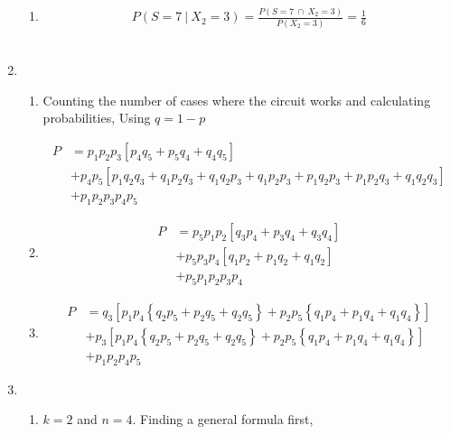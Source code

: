 \begin{enumerate}
\begin{enumerate}
			\item \begin{align}
				P(S = 7 \ |\ X_2 = 3) = \frac{P(S = 7 \ \cap\ X_2 = 3)}{P(X_2 = 3)} = \frac{1}{6}
			\end{align} \\
		
	\end{enumerate}
	
	\item \begin{enumerate}
		\item Counting the number of cases where the circuit works and calculating probabilities, Using $ q = 1-p $
		
			\begin{align}
				P &= p_1 p_2 p_3 \left[ p_4 q_5 + p_5 q_4 + q_4 q_5 \right] \nonumber \\
				&+ p_4 p_5 \left[ p_1 q_2 q_3 + q_1 p_2 q_3 + q_1 q_2 p_3 + q_1 p_2 p_3 + p_1 q_2 p_3 + p_1 p_2 q_3 + q_1 q_2 q_3 \right]	\nonumber \\
				&+ p_1 p_2 p_3 p_4 p_5
			\end{align}
		
		
		\item 
			\begin{align}
				P &= p_5 p_1 p_2 \left[ q_3 p_4 + p_3 q_4 + q_3 q_4 \right] \nonumber \\
				&+ p_5 p_3 p_4 \left[ q_1 p_2 + p_1 q_2 + q_1 q_2 \nonumber \right] \\
				&+ p_5 p_1 p_2 p_3 p_4
			\end{align}
		
		
		\item 
			\begin{align}
				P &= q_3 \left[ p_1 p_4 \left\{ q_2 p_5 + p_2 q_5 + q_2 q_5 \right\} + p_2 p_5 \left\{ q_1 p_4 + p_1 q_4 + q_1 q_4 \right\} \right] \nonumber \\
				&+ p_3 \left[ p_1 p_4 \left\{ q_2 p_5 + p_2 q_5 + q_2 q_5 \right\} + p_2 p_5 \left\{ q_1 p_4 + p_1 q_4 + q_1 q_4 \right\} \right] \nonumber \\
				&+ p_1 p_2 p_4 p_5 
			\end{align}
		
	\end{enumerate}
	
	\item \begin{enumerate}
		\item $ k = 2 $ and $ n = 4 $. Finding a general formula first, 
		

\end{enumerate}
\end{enumerate}
